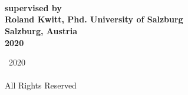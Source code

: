 

\thispagestyle{empty}

\begingroup
\centering
{}
~
\\[1em]
\sffamily\bfseries\fontsize{26}{31.2}\selectfont
\DocumentTitle
\\[0.4in]
\normalfont\large
\Large{\AuthorName}
\vspace{1cm}\\
\normalsize{supervised by}\\
\Large{Roland Kwitt, Phd.}
\vfill
University of Salzburg
\\[0.5em]
Salzburg, Austria
\\[1.5em]
2020
\par
\endgroup

\clearpage


\pagestyle{plain}
\setcounter{page}{2}

\begingroup
\centering
{}
\null
\vfill
{\sffamily\textcopyright}~2020
\\[0.5em]
\AuthorName
\\[0.5em]
All Rights Reserved
\par
\endgroup

\clearpage


